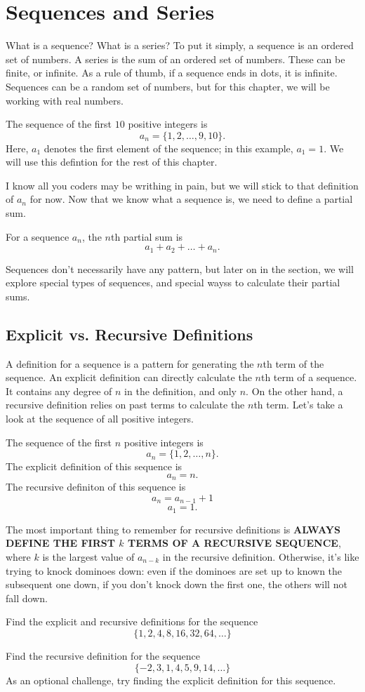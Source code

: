 \chapter{Sequences and Series}
What is a sequence? What is a series? To put it simply, a sequence is an ordered set of numbers. A series is the sum of an ordered set of numbers. These can be finite, or infinite. As a rule of thumb, if a sequence ends in dots, it is infinite. Sequences can be a random set of numbers, but for this chapter, we will be working with real numbers.
\begin{example}
    The sequence of the first $10$ positive integers is
    \[a_n=\{1,2,\dots,9,10\}.\]
    Here, $a_1$ denotes the first element of the sequence; in this example, $a_1=1$. We will use this defintion for the rest of this chapter.
\end{example}
I know all you coders may be writhing in pain, but we will stick to that definition of $a_n$ for now. Now that we know what a sequence is, we need to define a partial sum.
\begin{definition}
    For a sequence $a_n$, the $n$th partial sum is
    \[a_1+a_2+\dots+a_n.\]
\end{definition}
Sequences don't necessarily have any pattern, but later on in the section, we will explore special types of sequences, and special wayss to calculate their partial sums.
\section{Explicit vs. Recursive Definitions}
A definition for a sequence is a pattern for generating the $n$th term of the sequence. An explicit definition can directly calculate the $n$th term of a sequence. It contains any degree of $n$ in the definition, and only $n$. On the other hand, a recursive definition relies on past terms to calculate the $n$th term. Let's take a look at the sequence of all positive integers.
\begin{example}
    The sequence of the first $n$ positive integers is
    \[a_n=\{1,2,\dots,n\}.\]
    The explicit definition of this sequence is
    \[a_n=n.\]
    The recursive definiton of this sequence is
    \[a_n=a_{n-1}+1\]
    \[a_1=1.\]
\end{example}
The most important thing to remember for recursive definitions is \textbf{ALWAYS DEFINE THE FIRST $k$ TERMS OF A RECURSIVE SEQUENCE}, where $k$ is the largest value of $a_{n-k}$ in the recursive definition. Otherwise, it's like trying to knock dominoes down: even if the dominoes are set up to known the subsequent one down, if you don't knock down the first one, the others will not fall down.
\begin{problem}
    Find the explicit and recursive definitions for the sequence 
    \[\{1, 2, 4, 8, 16, 32, 64,\dots\}\]
\end{problem}
\begin{problem}
    Find the recursive definition for the sequence
    \[\{-2, 3, 1, 4, 5, 9, 14,\dots\}\]
    As an optional challenge, try finding the explicit definition for this sequence.
\end{problem}
